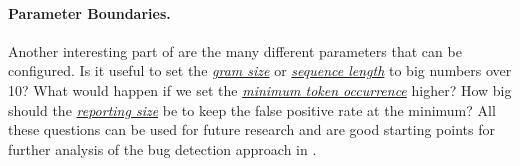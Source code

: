 \paragraph{Parameter Boundaries.}
Another interesting part of  are the many different parameters that can be configured. Is it useful to set the \hyperref[def:gram_size]{\textit{gram size}} or \hyperref[def:sequence_length]{\textit{sequence length}} to big numbers over 10? What would happen if we set the \hyperref[def:minimum_token_occurrence]{\textit{minimum token occurrence}} higher? How big should the \hyperref[def:reporting_size]{\textit{reporting size}} be to keep the false positive rate at the minimum? All these questions can be used for future research and are good starting points for further analysis of the \ngram{} bug detection approach in \scratch{}.






 
